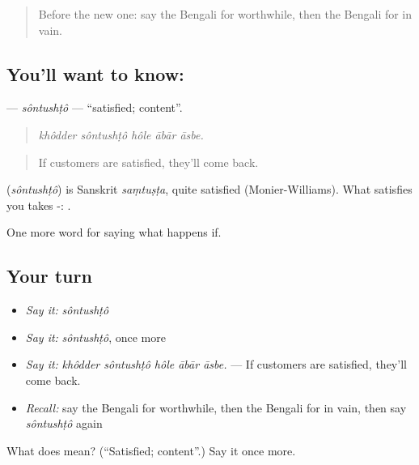 \begin{quote}
Before the new one: say the Bengali for worthwhile, then the Bengali for in vain.
\end{quote}

\subsection*{You'll want to know: }
\textbf{} — \emph{sôntushṭô} — \textquotedblleft{}satisfied; content\textquotedblright{}.

\begin{quote}
    
\end{quote}

\begin{quote}
\emph{khôdder sôntushṭô hôle ābār āsbe.}
\end{quote}

\begin{quote}
If customers are satisfied, they'll come back.
\end{quote}

\begin{cousinweb}
\textbf{} (\emph{sôntushṭô}) is Sanskrit \emph{saṃtuṣṭa}, quite satisfied (Monier-Williams). What satisfies you takes -:  .
\end{cousinweb}

\begin{grammarlens}[title={What you've built}]
One more word for saying what happens if.
\end{grammarlens}

\subsection*{Your turn}
\begin{itemize}
\raggedright
  \item \emph{Say it:} \emph{sôntushṭô}
  \item \emph{Say it:} \emph{sôntushṭô}, once more
  \item \emph{Say it:} \emph{khôdder sôntushṭô hôle ābār āsbe.} — If customers are satisfied, they'll come back.
  \item \emph{Recall:} say the Bengali for worthwhile, then the Bengali for in vain, then say \emph{sôntushṭô} again
\end{itemize}

\begin{tcolorbox}[breakable,colback=teal!4,colframe=teal!35!black,title={Before you move on}]
What does  mean? (\textquotedblleft{}Satisfied; content\textquotedblright{}.) Say it once more.
\end{tcolorbox}
